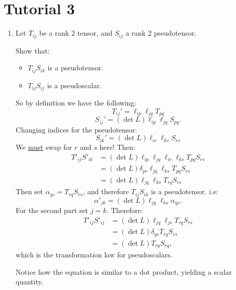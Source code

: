 \pagestyle{fancy}
\fancyhead{}

\section{Tutorial 3}
\begin{enumerate}
    \item Let $T_{ij}$ be a rank $2$ tensor, and $S_{ij}$ a rank 2 pseudotensor.

    Show that:
    \begin{itemize}
        \item $T_{ij}S_{ik}$ is a pseudotensor.
        \item $T_{ij}S_{ij}$ is a pseudoscalar. \\
    \end{itemize}
    
    So by definition we have the following:
    $$T_{ij}'=\ell_{ip}\ell_{jq}T_{pq}$$
    $$S_{ij}'=(\det L)\ell_{ip}\ell_{jq}S_{pq}.$$
    Changing indices for the pseudotensor:
    $$S_{ik}'=(\det L)\ell_{ir}\ell_{ks}S_{rs}$$
    We \underline{must} swap for $r$ and $s$ here! Then:
    \begin{align*}
        T'_{ij}S'_{ik}
        &=(\det L)\ell_{ip}\ell_{jq}\ell_{ir}\ell_{ks}T_{pq}S_{rs} \\
        &=(\det L)\delta_{pr}\ell_{jq}\ell_{ks}T_{pq}S_{rs} \\
        &=(\det L)\ell_{jq}\ell_{ks}T_{rq}S_{rs}
    \end{align*}
    Then set $\alpha_{qs}=T_{rq}S_{rs}$, and therefore $T_{ij}S_{ik}$ is a pseudotensor. i.e:
    $$\alpha'_{jk}=(\det L)\ell_{jq}\ell_{ks}\alpha_{qs}.$$
    For the second part set $j=k$. Therefore:
    \begin{align*}
        T'_{ij}S'_{ij}
        &=(\det L)\ell_{jq}\ell_{js}T_{rq}S_{rs} \\
        &=(\det L)\delta_{qs}T_{rq}S_{rs} \\
        &=(\det L)T_{rq}S_{rq},
    \end{align*}
    which is the transformation law for pseudoscalars.
    
    Notice how the equation is similar to a dot product, yielding a scalar quantity.
\end{enumerate}